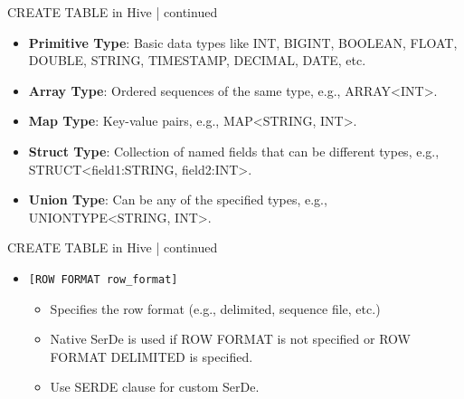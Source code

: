 \begin{frame}{CREATE TABLE in Hive | continued}
	\begin{tcolorbox}[colback=white,colframe=black,title= Part 2: Column Definitions (data_type)]
		\small	
			\begin{itemize}	
				\vspace{-0.2cm}\item \textbf{Primitive Type}: Basic data types like INT, BIGINT, BOOLEAN, FLOAT, DOUBLE, STRING, TIMESTAMP, DECIMAL, DATE, etc.
				\vspace{-0.2cm}\item \textbf{Array Type}: Ordered sequences of the same type, e.g., ARRAY<INT>.			
				\vspace{-0.2cm}\item \textbf{Map Type}: Key-value pairs, e.g., MAP<STRING, INT>.				
				\vspace{-0.2cm}\item \textbf{Struct Type}: Collection of named fields that can be different types, e.g., STRUCT<field1:STRING, field2:INT>.				
				\vspace{-0.2cm}\item \textbf{Union Type}: Can be any of the specified types, e.g., UNIONTYPE<STRING, INT>.		  
			\end{itemize}
	\end{tcolorbox}
\end{frame}
\begin{frame}{CREATE TABLE in Hive | continued}
	\begin{tcolorbox}[colback=white,colframe=black,title= Part 3: Row Format and SerDe in Hive]
		\small
	\begin{itemize}
	  \item \texttt{[ROW FORMAT row\_format]}
	  \begin{itemize}
		\item Specifies the row format (e.g., delimited, sequence file, etc.)
		\item Native SerDe is used if ROW FORMAT is not specified or ROW FORMAT DELIMITED is specified.
		\item Use SERDE clause for custom SerDe.
	  \end{itemize}
	\end{itemize}
	\end{tcolorbox}
  \end{frame}
